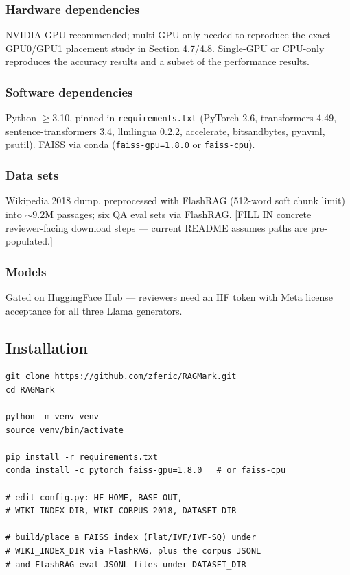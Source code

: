 \subsubsection{Hardware dependencies}
NVIDIA GPU recommended; multi-GPU only needed to reproduce the exact
GPU0/GPU1 placement study in Section 4.7/4.8. Single-GPU or CPU-only
reproduces the accuracy results and a subset of the performance results.

\subsubsection{Software dependencies}
Python $\geq$3.10, pinned in \texttt{requirements.txt} (PyTorch 2.6, transformers 4.49, sentence-transformers 3.4, llmlingua 0.2.2, accelerate, bitsandbytes, pynvml, psutil). FAISS via conda (\texttt{faiss-gpu=1.8.0} or \texttt{faiss-cpu}).

\subsubsection{Data sets}
Wikipedia 2018 dump, preprocessed with FlashRAG (512-word soft chunk limit) into $\sim$9.2M passages; six QA eval sets via FlashRAG. [FILL IN concrete reviewer-facing download steps — current README assumes paths are pre-populated.]

\subsubsection{Models}
Gated on HuggingFace Hub — reviewers need an HF token with Meta license acceptance for all three Llama generators.

\subsection{Installation}
\begin{verbatim}
git clone https://github.com/zferic/RAGMark.git
cd RAGMark

python -m venv venv
source venv/bin/activate

pip install -r requirements.txt
conda install -c pytorch faiss-gpu=1.8.0   # or faiss-cpu

# edit config.py: HF_HOME, BASE_OUT,
# WIKI_INDEX_DIR, WIKI_CORPUS_2018, DATASET_DIR

# build/place a FAISS index (Flat/IVF/IVF-SQ) under
# WIKI_INDEX_DIR via FlashRAG, plus the corpus JSONL
# and FlashRAG eval JSONL files under DATASET_DIR
\end{verbatim}

